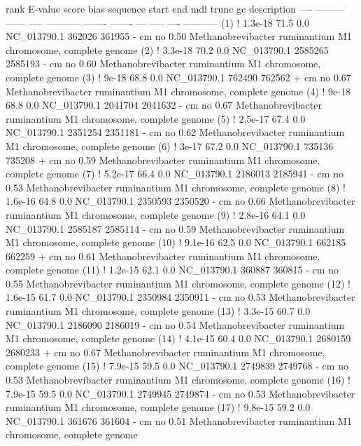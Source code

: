 \begin{sreoutput}
 rank     E-value  score  bias  sequence      start     end   mdl trunc   gc  description
 ----   --------- ------ -----  ----------- ------- -------   --- ----- ----  -----------
  (1) !   1.3e-18   71.5   0.0  NC_013790.1  362026  361955 -  cm    no 0.50  Methanobrevibacter ruminantium M1 chromosome, complete genome
  (2) !   3.3e-18   70.2   0.0  NC_013790.1 2585265 2585193 -  cm    no 0.60  Methanobrevibacter ruminantium M1 chromosome, complete genome
  (3) !     9e-18   68.8   0.0  NC_013790.1  762490  762562 +  cm    no 0.67  Methanobrevibacter ruminantium M1 chromosome, complete genome
  (4) !     9e-18   68.8   0.0  NC_013790.1 2041704 2041632 -  cm    no 0.67  Methanobrevibacter ruminantium M1 chromosome, complete genome
  (5) !   2.5e-17   67.4   0.0  NC_013790.1 2351254 2351181 -  cm    no 0.62  Methanobrevibacter ruminantium M1 chromosome, complete genome
  (6) !     3e-17   67.2   0.0  NC_013790.1  735136  735208 +  cm    no 0.59  Methanobrevibacter ruminantium M1 chromosome, complete genome
  (7) !   5.2e-17   66.4   0.0  NC_013790.1 2186013 2185941 -  cm    no 0.53  Methanobrevibacter ruminantium M1 chromosome, complete genome
  (8) !   1.6e-16   64.8   0.0  NC_013790.1 2350593 2350520 -  cm    no 0.66  Methanobrevibacter ruminantium M1 chromosome, complete genome
  (9) !   2.8e-16   64.1   0.0  NC_013790.1 2585187 2585114 -  cm    no 0.59  Methanobrevibacter ruminantium M1 chromosome, complete genome
 (10) !   9.1e-16   62.5   0.0  NC_013790.1  662185  662259 +  cm    no 0.61  Methanobrevibacter ruminantium M1 chromosome, complete genome
 (11) !   1.2e-15   62.1   0.0  NC_013790.1  360887  360815 -  cm    no 0.55  Methanobrevibacter ruminantium M1 chromosome, complete genome
 (12) !   1.6e-15   61.7   0.0  NC_013790.1 2350984 2350911 -  cm    no 0.53  Methanobrevibacter ruminantium M1 chromosome, complete genome
 (13) !   3.3e-15   60.7   0.0  NC_013790.1 2186090 2186019 -  cm    no 0.54  Methanobrevibacter ruminantium M1 chromosome, complete genome
 (14) !   4.1e-15   60.4   0.0  NC_013790.1 2680159 2680233 +  cm    no 0.67  Methanobrevibacter ruminantium M1 chromosome, complete genome
 (15) !   7.9e-15   59.5   0.0  NC_013790.1 2749839 2749768 -  cm    no 0.53  Methanobrevibacter ruminantium M1 chromosome, complete genome
 (16) !   7.9e-15   59.5   0.0  NC_013790.1 2749945 2749874 -  cm    no 0.53  Methanobrevibacter ruminantium M1 chromosome, complete genome
 (17) !   9.8e-15   59.2   0.0  NC_013790.1  361676  361604 -  cm    no 0.51  Methanobrevibacter ruminantium M1 chromosome, complete genome

\end{sreoutput}
